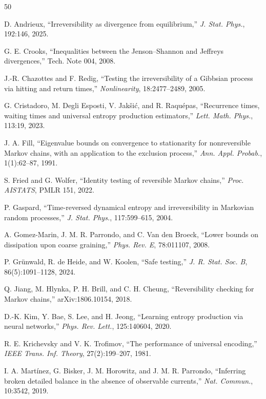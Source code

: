 \documentclass[11pt]{article}
\theoremstyle{definition}
\theoremstyle{remark}
\begin{document}
\begin{thebibliography}{50}

D. Andrieux, ``Irreversibility as divergence from equilibrium,'' \emph{J. Stat. Phys.}, 192:146, 2025.

G. E. Crooks, ``Inequalities between the Jenson--Shannon and Jeffreys divergences,'' Tech. Note 004, 2008.

J.-R. Chazottes and F. Redig, ``Testing the irreversibility of a Gibbsian process via hitting and return times,'' \emph{Nonlinearity}, 18:2477--2489, 2005.

G. Cristadoro, M. Degli Esposti, V. Jak\v{s}i\'c, and R. Raqu\'epas, ``Recurrence times, waiting times and universal entropy production estimators,'' \emph{Lett. Math. Phys.}, 113:19, 2023.

J. A. Fill, ``Eigenvalue bounds on convergence to stationarity for nonreversible Markov chains, with an application to the exclusion process,'' \emph{Ann. Appl. Probab.}, 1(1):62--87, 1991.

S. Fried and G. Wolfer, ``Identity testing of reversible Markov chains,'' \emph{Proc. AISTATS}, PMLR 151, 2022.

P. Gaspard, ``Time-reversed dynamical entropy and irreversibility in Markovian random processes,'' \emph{J. Stat. Phys.}, 117:599--615, 2004.

A. Gomez-Marin, J. M. R. Parrondo, and C. Van den Broeck, ``Lower bounds on dissipation upon coarse graining,'' \emph{Phys. Rev. E}, 78:011107, 2008.

P. Gr\"unwald, R. de Heide, and W. Koolen, ``Safe testing,'' \emph{J. R. Stat. Soc. B}, 86(5):1091--1128, 2024.

Q. Jiang, M. Hlynka, P. H. Brill, and C. H. Cheung, ``Reversibility checking for Markov chains,'' arXiv:1806.10154, 2018.

D.-K. Kim, Y. Bae, S. Lee, and H. Jeong, ``Learning entropy production via neural networks,'' \emph{Phys. Rev. Lett.}, 125:140604, 2020.

R. E. Krichevsky and V. K. Trofimov, ``The performance of universal encoding,'' \emph{IEEE Trans. Inf. Theory}, 27(2):199--207, 1981.

I. A. Mart\'inez, G. Bisker, J. M. Horowitz, and J. M. R. Parrondo, ``Inferring broken detailed balance in the absence of observable currents,'' \emph{Nat. Commun.}, 10:3542, 2019.


\end{thebibliography}
\end{document}
